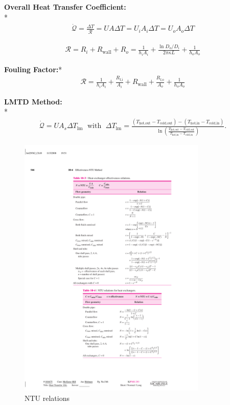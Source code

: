 \begin{datasheet}
\pagebreak[0]

{\bf Overall Heat Transfer Coefficient:}\\*
\begin{align*}
  \dot{\mathcal{Q}} =  \frac{\Delta T}{\mathcal{R}} = U A \Delta T  = U_{i}A_{i}\Delta T = U_{o}A_{o}\Delta T
\end{align*}

\begin{align*}
  \mathcal{R} = R_{i} + R_{\text{wall}} + R_{o} = \frac{1}{h_{i}A_{i}} + \frac{\ln{D_{o}/D_{i}}}{2\pi \kappa L} + \frac{1}{h_{o}A_{o}} 
\end{align*}

{\bf Fouling Factor:}*
\begin{align*}
   \mathcal{R} = \frac{1}{h_{i}A_{i}} + \frac{R_{\text{f,i}}}{A_{i}} + R_{\text{wall}} + \frac{R_{\text{f,o}}}{A_{o}} + \frac{1}{h_{o}A_{o}}
\end{align*}

{\bf LMTD Method:}\\*
\begin{align*}
   \dot{\mathcal{Q}} = U A_{s} \Delta T_{\text{lm}}\;\text{ with }\;  \Delta T_{\text{lm}} = \frac{\left(T_{\text{hot,out}} - T_{\text{cold,out}}\right)-\left(T_{\text{hot,in}} - T_{\text{cold,in}}\right)}{\ln{\left(\frac{T_{\text{hot,out}} - T_{\text{cold,out}}}{T_{\text{hot,in}} - T_{\text{cold,in}}}\right)}}.
\end{align*}

\begin{figure}[h!]%
  \begin{center}%
    \includegraphics[width=0.8\textwidth,clip]{figures/NTU}
  \end{center}
  \caption{NTU relations}
\end{figure}



\end{datasheet}
